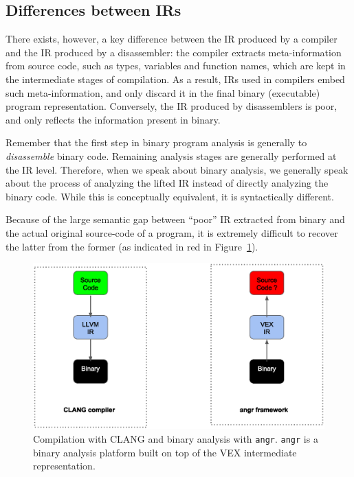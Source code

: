 \documentclass{article}
\begin{document}
\subsection{Differences between IRs}
There exists, however, a key difference between the IR produced by a compiler and the IR produced by a disassembler: the compiler extracts meta-information from source code, such as types, variables and function names, which are kept in the intermediate stages of compilation. As a result, IRs used in compilers embed such meta-information, and only discard it in the final binary (executable) program representation.
Conversely, the IR produced by disassemblers is poor, and only reflects the information present in binary.

Remember that the first step in binary program analysis is generally to \emph{disassemble} binary code. Remaining analysis stages are generally performed at the IR level. Therefore, when we speak about binary analysis, we generally speak about the process of analyzing the lifted IR instead of directly analyzing the binary code. While this is conceptually equivalent, it is syntactically different.

Because of the large semantic gap between ``poor'' IR extracted from binary and the actual original source-code of a program, it is extremely difficult to recover the latter from the former (as indicated in red in Figure~\ref{fig:compilation}).

	\begin{figure}[h]
		\centering
		\includegraphics[width=.9\textwidth]{compilation.eps}
		\caption{Compilation with CLANG and binary analysis with \texttt{angr}. \texttt{angr} is a binary analysis platform built on top of the VEX intermediate representation.}
		\label{fig:compilation}
	\end{figure}
\end{document}
